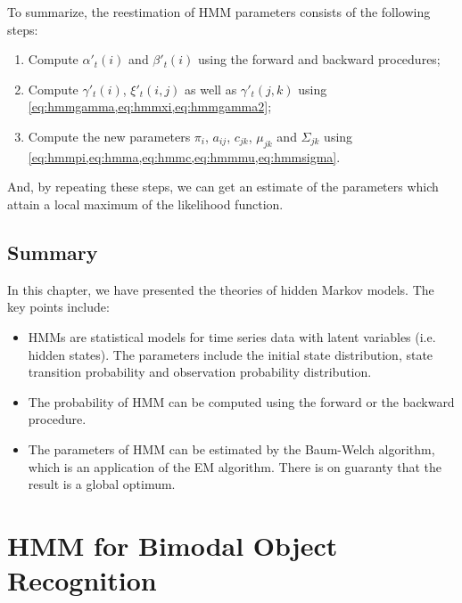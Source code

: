 \documentclass[12pt,final,twoside]{report}
\theoremstyle{plain}
\theoremstyle{definition}
\theoremstyle{remark}
\begin{document}
To summarize, the reestimation of HMM parameters consists of the following steps:
\begin{enumerate}
  \item Compute $\alpha'_t(i)$ and $\beta'_t(i)$ using the forward and backward procedures;
  \item Compute $\gamma'_t(i)$, $\xi'_t(i,j)$ as well as $\gamma'_t(j,k)$ using \cref{eq:hmmgamma,eq:hmmxi,eq:hmmgamma2};
  \item Compute the new parameters $\pi_i$, $a_{ij}$, $c_{jk}$, $\mu_{jk}$ and $\Sigma_{jk}$ using \cref{eq:hmmpi,eq:hmma,eq:hmmc,eq:hmmmu,eq:hmmsigma}.
\end{enumerate}
And, by repeating these steps, we can get an estimate of the parameters which attain a local maximum of the likelihood function.

\section{Summary}
In this chapter, we have presented the theories of hidden Markov models. The key points include:
\begin{itemize}
  \item HMMs are statistical models for time series data with latent variables (i.e. hidden states). The parameters include the initial state distribution, state transition probability and observation probability distribution.
  \item The probability of HMM can be computed using the forward or the backward procedure.
  \item The parameters of HMM can be estimated by the Baum-Welch algorithm, which is an application of the EM algorithm. There is on guaranty that the result is a global optimum.
\end{itemize}

\cleardoublepage
\chapter{HMM for Bimodal Object Recognition}
\end{document}
